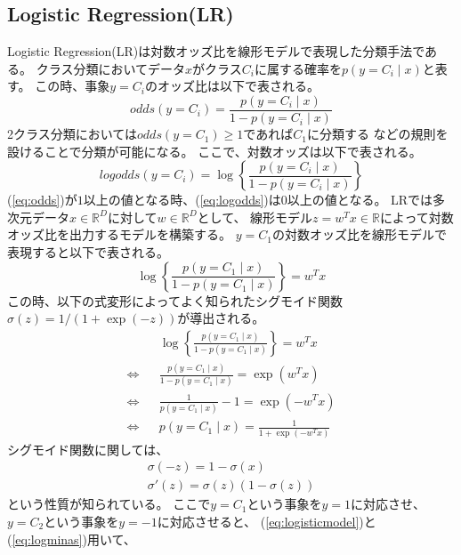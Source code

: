 \subsection{\rm Logistic Regression(LR)}
Logistic Regression(LR)は対数オッズ比を線形モデルで表現した分類手法である。
クラス分類においてデータ\(x\)がクラス\(C_i\)に属する確率を\(p(y=C_i\mid x)\)と表す。
この時、事象\(y=C_i\)のオッズ比は以下で表される。
\begin{equation}
    odds(y=C_i) = \frac{p(y=C_i \mid x)}{1-p(y=C_i \mid x)}
    \label{eq:odds}
\end{equation}
2クラス分類においては\(odds(y=C_1) \geq 1\)であれば\(C_1\)に分類する
などの規則を設けることで分類が可能になる。
ここで、対数オッズは以下で表される。
\begin{equation}
    logodds(y=C_i) = \log \left\{ \frac{p(y=C_i \mid x)}{1-p(y=C_i \mid x)} \right\}
    \label{eq:logodds}
\end{equation}
(\ref{eq:odds})が\(1\)以上の値となる時、(\ref{eq:logodds})は\(0\)以上の値となる。
LRでは多次元データ\(x\in \mathbb R^D\)に対して\(w \in \mathbb R^D\)として、
線形モデル\(z=w^Tx \in \mathbb R\)によって対数オッズ比を出力するモデルを構築する。
\(y = C_1\)の対数オッズ比を線形モデルで表現すると以下で表される。
\begin{equation}
    \log \left\{ \frac{p(y=C_1 \mid x)}{1-p(y=C_1 \mid x)} \right\} = w^Tx
    \label{eq:logoddsmodel}
\end{equation}
この時、以下の式変形によってよく知られたシグモイド関数\(\sigma(z)=1/(1+\exp(-z))\)が導出される。
\begin{eqnarray}
    && \log \left\{ \frac{p(y=C_1 \mid x)}{1-p(y=C_1 \mid x)} \right\}  =  w^Tx \nonumber \\
    \iff && \frac{p(y=C_1 \mid x)}{1-p(y=C_1 \mid x)}  =  \exp(w^Tx) \nonumber \\
    \iff && \frac{1}{p(y=C_1 \mid x)}-1  =  \exp(-w^Tx) \nonumber \\
    \iff && p(y=C_1 \mid x)  =  \frac{1}{1+\exp(-w^Tx)} 
    \label{eq:logisticmodel}
\end{eqnarray}
シグモイド関数に関しては、
\begin{eqnarray}
    \label{eq:logminas}
    \sigma(-z) = 1-\sigma(x)　\\
    \sigma'(z) = \sigma(z)(1-\sigma(z))
\end{eqnarray}
という性質が知られている。
ここで\(y=C_1\)という事象を\(y=1\)に対応させ、\(y=C_2\)という事象を\(y=-1\)に対応させると、
(\ref{eq:logisticmodel})と(\ref{eq:logminas})用いて、
